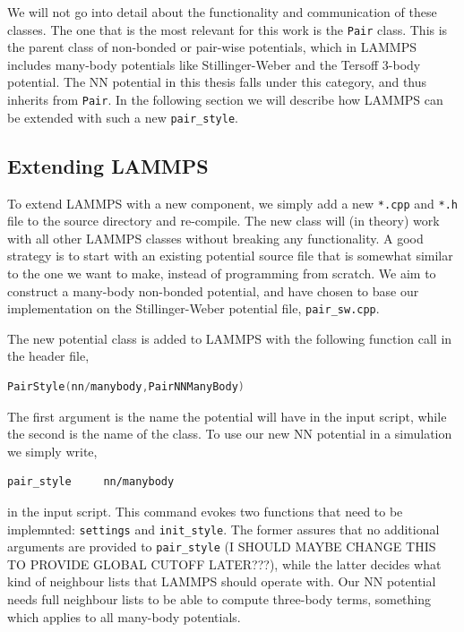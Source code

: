 \documentclass[twoside,english]{uiofysmaster}
\begin{document}
We will not go into detail about the functionality
and communication of these classes. The one
that is the most relevant for this work is the \texttt{Pair} class. 
This is the parent class of non-bonded or pair-wise potentials, which
in LAMMPS includes many-body potentials like Stillinger-Weber and 
the Tersoff 3-body potential. The NN potential in this thesis falls 
under this category, and thus inherits from \texttt{Pair}. 
In the following section we will describe how 
LAMMPS can be extended with such a new \texttt{pair\_style}.

\subsection{Extending LAMMPS} \label{sec:extendingLammps}
To extend LAMMPS with a new component, we 
simply add a new \texttt{*.cpp} and \texttt{*.h} file to the 
source directory and re-compile. The new class
will (in theory) work with all other LAMMPS 
classes without breaking any functionality. 
A good strategy is to start with an existing potential
source file that is somewhat similar to the one 
we want to make, instead of programming from scratch.
We aim to construct a many-body non-bonded potential, and 
have chosen to base our implementation on the 
Stillinger-Weber potential file, \texttt{pair\_sw.cpp}.

The new potential class is added to LAMMPS with the following function call in the header file,
\begin{lstlisting}[language=c++]
 PairStyle(nn/manybody,PairNNManyBody)
\end{lstlisting}
The first argument is the name the potential will have in the input script, while 
the second is the name of the class. 
To use our new NN potential in a simulation we simply write,
\begin{lstlisting}[style=lammps]
 pair_style 	nn/manybody
\end{lstlisting}
in the input script. This command evokes two functions that need to be implemnted: \texttt{settings}
and \texttt{init\_style}. The former assures that no additional arguments are provided to 
\texttt{pair\_style} (I SHOULD MAYBE CHANGE THIS TO PROVIDE GLOBAL CUTOFF LATER???), while the latter
decides what kind of neighbour lists that LAMMPS should operate with. Our NN potential needs 
full neighbour lists to be able to compute three-body terms, something which applies to all many-body potentials. 
\end{document}
